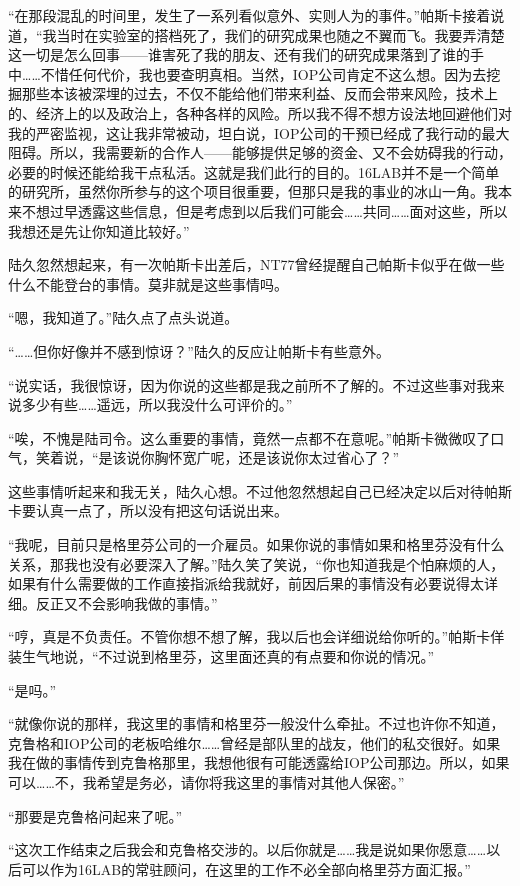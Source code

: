 “在那段混乱的时间里，发生了一系列看似意外、实则人为的事件。”帕斯卡接着说道，“我当时在实验室的搭档死了，我们的研究成果也随之不翼而飞。我要弄清楚这一切是怎么回事——谁害死了我的朋友、还有我们的研究成果落到了谁的手中……不惜任何代价，我也要查明真相。当然，IOP公司肯定不这么想。因为去挖掘那些本该被深埋的过去，不仅不能给他们带来利益、反而会带来风险，技术上的、经济上的以及政治上，各种各样的风险。所以我不得不想方设法地回避他们对我的严密监视，这让我非常被动，坦白说，IOP公司的干预已经成了我行动的最大阻碍。所以，我需要新的合作人——能够提供足够的资金、又不会妨碍我的行动，必要的时候还能给我干点私活。这就是我们此行的目的。16LAB并不是一个简单的研究所，虽然你所参与的这个项目很重要，但那只是我的事业的冰山一角。我本来不想过早透露这些信息，但是考虑到以后我们可能会……共同……面对这些，所以我想还是先让你知道比较好。”

陆久忽然想起来，有一次帕斯卡出差后，NT77曾经提醒自己帕斯卡似乎在做一些什么不能登台的事情。莫非就是这些事情吗。

“嗯，我知道了。”陆久点了点头说道。

“……但你好像并不感到惊讶？”陆久的反应让帕斯卡有些意外。

“说实话，我很惊讶，因为你说的这些都是我之前所不了解的。不过这些事对我来说多少有些……遥远，所以我没什么可评价的。”

“唉，不愧是陆司令。这么重要的事情，竟然一点都不在意呢。”帕斯卡微微叹了口气，笑着说，“是该说你胸怀宽广呢，还是该说你太过省心了？”

这些事情听起来和我无关，陆久心想。不过他忽然想起自己已经决定以后对待帕斯卡要认真一点了，所以没有把这句话说出来。

“我呢，目前只是格里芬公司的一介雇员。如果你说的事情如果和格里芬没有什么关系，那我也没有必要深入了解。”陆久笑了笑说，“你也知道我是个怕麻烦的人，如果有什么需要做的工作直接指派给我就好，前因后果的事情没有必要说得太详细。反正又不会影响我做的事情。”

“哼，真是不负责任。不管你想不想了解，我以后也会详细说给你听的。”帕斯卡佯装生气地说，“不过说到格里芬，这里面还真的有点要和你说的情况。”

“是吗。”

“就像你说的那样，我这里的事情和格里芬一般没什么牵扯。不过也许你不知道，克鲁格和IOP公司的老板哈维尔……曾经是部队里的战友，他们的私交很好。如果我在做的事情传到克鲁格那里，我想他很有可能透露给IOP公司那边。所以，如果可以……不，我希望是务必，请你将我这里的事情对其他人保密。”

“那要是克鲁格问起来了呢。”

“这次工作结束之后我会和克鲁格交涉的。以后你就是……我是说如果你愿意……以后可以作为16LAB的常驻顾问，在这里的工作不必全部向格里芬方面汇报。”

